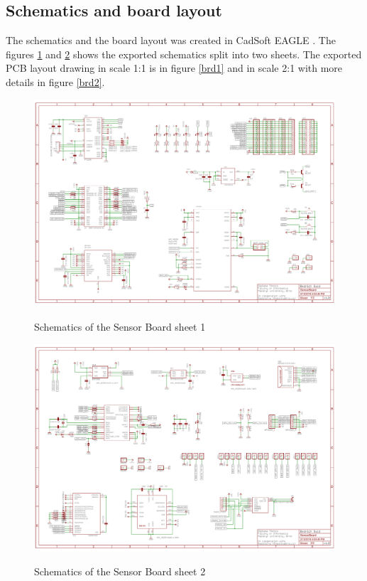 \subsection{Schematics and board layout}
The schematics and the board layout was created in CadSoft EAGLE \cite{EAGLE}. The figures \ref{sch1} and \ref{sch2} shows the exported schematics split into two sheets. The exported PCB layout drawing in scale 1:1 is in figure \ref{brd1} and in scale 2:1 with more details in figure \ref{brd2}.

\begin{figure}[H]
	\centering
	\includegraphics[angle=90, scale=1]{img/sch1.pdf}
	\label{sch1}
	\caption{Schematics of the Sensor Board sheet 1}
\end{figure}

\begin{figure}[H]
	\centering
	\includegraphics[angle=90, scale=1]{img/sch2.pdf}
	\label{sch2}
	\caption{Schematics of the Sensor Board sheet 2}
\end{figure}

